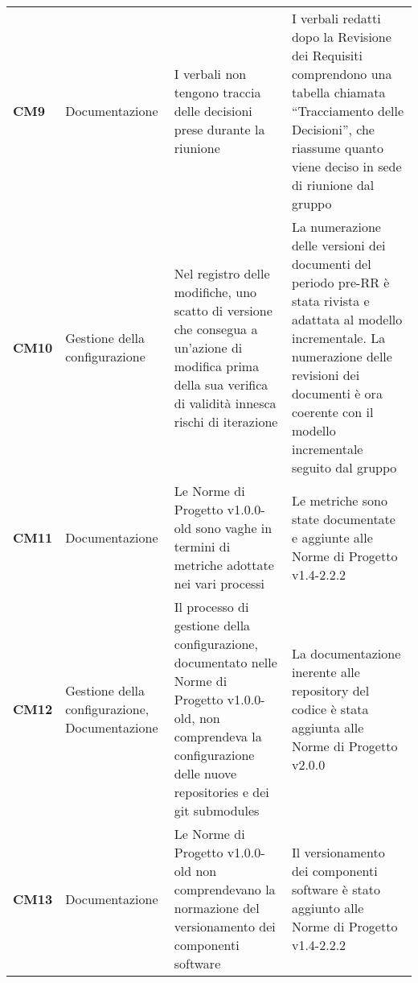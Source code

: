 \documentclass[../piano-di-qualifica.tex]{subfiles}
\begin{document}
\begin{longtable}[H]{>{\centering\bfseries}m{2.5cm} >{\centering}m{2.5cm} >{\centering}m{5.5cm} >{\centering\arraybackslash}m{5.5cm}}
CM9  & Documentazione                                & I verbali non tengono traccia delle decisioni prese durante la riunione                                                                                                       & I verbali redatti dopo la Revisione dei Requisiti comprendono una tabella chiamata “Tracciamento delle Decisioni”, che riassume quanto viene deciso in sede di riunione dal gruppo                                                                                                                                                                  \\
CM10 & Gestione della configurazione                 & Nel registro delle modifiche, uno scatto di versione che consegua a un’azione di modifica prima della sua verifica di validità innesca rischi di iterazione                   & La numerazione delle versioni dei documenti del periodo pre-RR è stata rivista e adattata al modello incrementale. La numerazione delle revisioni dei documenti è ora coerente con il modello incrementale seguito dal gruppo                                                                                                                       \\
CM11 & Documentazione                                & Le Norme di Progetto v1.0.0-old sono vaghe in termini di metriche adottate nei vari processi                                                                                  & Le metriche sono state documentate e aggiunte alle Norme di Progetto v1.4-2.2.2                                                                                                                                                                                                                                                                     \\
CM12 & Gestione della configurazione, Documentazione & Il processo di gestione della configurazione, documentato nelle Norme di Progetto v1.0.0-old, non comprendeva la configurazione delle nuove repositories e dei git submodules & La documentazione inerente alle repository del codice è stata aggiunta alle Norme di Progetto v2.0.0                                                                                                                                                                                                                                                \\
CM13 & Documentazione                                & Le Norme di Progetto v1.0.0-old non comprendevano la normazione del versionamento dei componenti software                                                                     & Il versionamento dei componenti software è stato aggiunto alle Norme di Progetto v1.4-2.2.2                                                                                                                                                                                                                                                         \\

\end{longtable}
\end{document}
